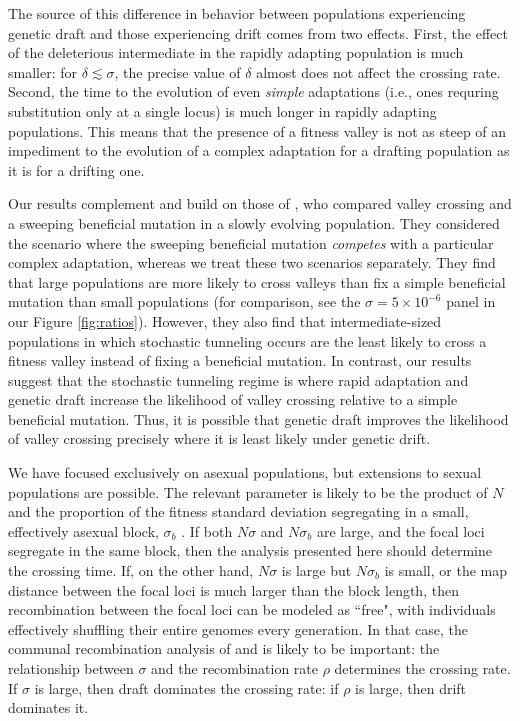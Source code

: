 \documentclass[rmp]{revtex4}
\begin{document}
\begin{spacing}{1.5}
The source of this difference in behavior between populations experiencing genetic draft and those experiencing drift comes from two effects.
First, the effect of the deleterious intermediate in the rapidly adapting population is much smaller: for $\delta \lesssim \sigma$, the precise value of $\delta$ almost does not affect the crossing rate.
Second, the time to the evolution of even \emph{simple} adaptations (i.e., ones requring substitution only at a single locus) is much longer in rapidly adapting populations.
This means that the presence of a fitness valley is not as steep of an impediment to the evolution of a complex adaptation for a drafting population as it is for a drifting one.

Our results complement and build on those of \citet{ochs_2015}, who compared valley crossing and a sweeping beneficial mutation in a slowly evolving population.
They considered the scenario where the sweeping beneficial mutation \emph{competes} with a particular complex adaptation, whereas we treat these two scenarios separately.
They find that large populations are more likely to cross valleys than fix a simple beneficial mutation than small populations (for comparison, see the $\sigma=5 \times 10^{-6}$ panel in our Figure \ref{fig:ratios}).
However, they also find that intermediate-sized populations in which stochastic tunneling occurs are the least likely to cross a fitness valley instead of fixing a beneficial mutation.
In contrast, our results suggest that the stochastic tunneling regime is where rapid adaptation and genetic draft increase the likelihood of valley crossing relative to a simple beneficial mutation.
Thus, it is possible that genetic draft improves the likelihood of valley crossing precisely where it is least likely under genetic drift. 

We have focused exclusively on asexual populations, but extensions to sexual populations are possible.
The relevant parameter is likely to be the product of $N$ and the proportion of the fitness standard deviation segregating in a small, effectively asexual block, $\sigma_b$ \citep{neher_kessinger_2013}.
If both $N\sigma$ and $N\sigma_b$ are large, and the focal loci segregate in the same block, then the analysis presented here should determine the crossing time.
If, on the other hand, $N\sigma$ is large but $N\sigma_b$ is small, or the map distance between the focal loci is much larger than the block length, then recombination between the focal loci can be modeled as ``free", with individuals effectively shuffling their entire genomes every generation.
In that case, the communal recombination analysis of \citet{neher_shraiman_2011} and \citet{neher_shraiman_2010} is likely to be important: the relationship between $\sigma$ and the recombination rate $\rho$ determines the crossing rate.
If $\sigma$ is large, then draft dominates the crossing rate: if $\rho$ is large, then drift dominates it.


\end{spacing}
\end{document}
